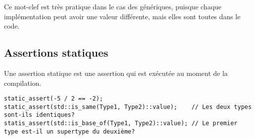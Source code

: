 \documentclass[10pt,a4paper,french]{article}
\begin{document}
Ce mot-clef est très pratique dans le cas des génériques, puisque chaque implémentation peut avoir une valeur différente, mais elles sont toutes dans le code.

\subsection{Assertions statiques}

Une assertion statique est une assertion qui est exécutée au moment de la compilation.

\begin{verbatim}
static_assert(-5 / 2 == -2);
static_assert(std::is_same(Type1, Type2)::value);    // Les deux types sont-ils identiques?
statis_assert(std::is_base_of(Type1, Type2)::value); // Le premier type est-il un supertype du deuxième?
\end{verbatim}

\appendix %

\end{document}
